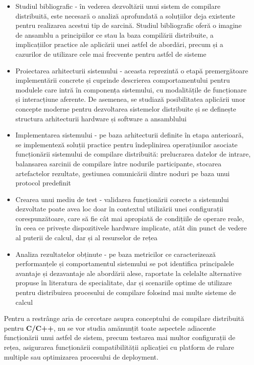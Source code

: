 \begin{itemize}
    \item Studiul bibliografic - în vederea dezvoltării unui sistem de compilare
    distribuită, este necesară o analiză aprofundată a soluțiilor deja existente
    pentru realizarea acestui tip de sarcină. Studiul bibliografic oferă o 
    imagine de ansamblu a principiilor ce stau la baza compilării
    distribuite, a implicațiilor practice ale aplicării unei astfel de abordări,
    precum și a cazurilor de utilizare cele mai frecvente pentru astfel de sisteme
    \item Proiectarea arhitecturii sistemului - aceasta reprezintă o etapă premergătoare
    implementării concrete și cuprinde descrierea comportamentului pentru modulele
    care intră în componența sistemului, cu modalitățile de funcționare și interacțiune
    aferente. De asemenea, se studiază posibilitatea aplicării unor concepte moderne
    pentru dezvoltarea sistemelor distribuite și se definește structura arhitecturii
    hardware și software a ansamblului
    \item Implementarea sistemului - pe baza arhitecturii definite în etapa anterioară,
    se implementeză soluții practice pentru îndeplinirea operațiunilor asociate funcționării
    sistemului de compilare distribuită: prelucrarea datelor de intrare, balansarea sarcinii
    de compilare între nodurile participante, stocarea artefactelor rezultate, gestiunea
    comunicării dintre noduri pe baza unui protocol predefinit
    \item Crearea unui mediu de test - validarea funcționării corecte a sistemului
    dezvoltate poate avea loc doar în contextul utilizării unei configurații
    corespunzătoare, care să fie cât mai apropiată de condițiile de operare reale, în
    ceea ce privește dispozitivele hardware implicate, atât din punct de vedere al puterii
    de calcul, dar și al resurselor de rețea
    \item Analiza rezultatelor obținute - pe baza metricilor ce caracterizează 
    performanțele și comportamentul sistemului se pot identifica principalele avantaje și 
    dezavantaje ale abordării alese, raportate la celelalte alternative propuse în 
    literatura de specialitate, dar și scenariile optime de utilizare pentru distribuirea 
    procesului de compilare folosind mai multe sisteme de calcul 
\end{itemize}

Pentru a restrânge aria de cercetare asupra conceptului de compilare distribuită
pentru \textbf{C/C++}, nu se vor studia amănunțit toate aspectele adiacente funcționării
unui astfel de sistem, precum testarea mai multor configurații de rețea, asigurarea 
funcționării compatibilității aplicației cu platform de rulare multiple sau optimizarea
procesului de deployment.

